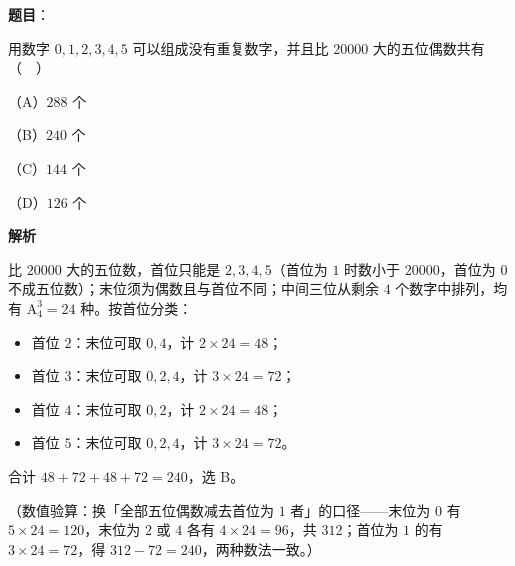 \begin{answer}

\textbf{题目}：

用数字 $0,1,2,3,4,5$ 可以组成没有重复数字，并且比 $20000$ 大的五位偶数共有（　）

（A）$288$ 个

（B）$240$ 个

（C）$144$ 个

（D）$126$ 个

\textbf{解析}

比 $20000$ 大的五位数，首位只能是 $2,3,4,5$（首位为 $1$ 时数小于 $20000$，首位为 $0$ 不成五位数）；末位须为偶数且与首位不同；中间三位从剩余 $4$ 个数字中排列，均有 $\mathrm{A}_4^{3}=24$ 种。按首位分类：

\begin{itemize}
\item 首位 $2$：末位可取 $0,4$，计 $2\times24=48$；
\item 首位 $3$：末位可取 $0,2,4$，计 $3\times24=72$；
\item 首位 $4$：末位可取 $0,2$，计 $2\times24=48$；
\item 首位 $5$：末位可取 $0,2,4$，计 $3\times24=72$。
\end{itemize}

合计 $48+72+48+72=240$，选 B。

（数值验算：换「全部五位偶数减去首位为 $1$ 者」的口径——末位为 $0$ 有 $5\times24=120$，末位为 $2$ 或 $4$ 各有 $4\times24=96$，共 $312$；首位为 $1$ 的有 $3\times24=72$，得 $312-72=240$，两种数法一致。）


\end{answer}
